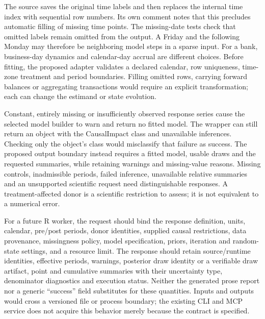 The source saves the original time labels and then replaces the internal
time index with sequential row numbers. Its own comment notes that this
precludes automatic filling of missing time points. The missing-date tests
check that omitted labels remain omitted from the output. A Friday and the
following Monday may therefore be neighboring model steps in a sparse input.
For a bank, business-day dynamics and calendar-day accrual are different
choices. Before fitting, the proposed adapter validates a declared calendar,
row uniqueness, time-zone treatment and period boundaries. Filling omitted
rows, carrying forward balances or aggregating transactions would require
an explicit transformation; each can change the estimand or state evolution.
\citep{exec13_ci_semantics}

Constant, entirely missing or insufficiently observed response series cause
the selected model builder to warn and return no fitted model. The wrapper
can still return an object with the CausalImpact class and unavailable
inferences. Checking only the object's class would misclassify that failure
as success. The proposed output boundary instead requires a fitted model,
usable draws and the requested summaries, while retaining warnings and
missing-value reasons. Missing controls, inadmissible periods, failed
inference, unavailable relative summaries and an unsupported scientific
request need distinguishable responses. A treatment-affected donor is a
scientific restriction to assess; it is not equivalent to a numerical error.
\citep{exec13_ci_semantics,exec13_ci_reuse}

For a future R worker, the request should bind the response definition,
units, calendar, pre/post periods, donor identities, supplied causal
restrictions, data provenance, missingness policy, model specification,
priors, iteration and random-state settings, and a resource limit. The
response should retain source/runtime identities, effective periods,
warnings, posterior draw identity or a verifiable draw artifact, point and
cumulative summaries with their uncertainty type, denominator diagnostics
and execution status. Neither the generated prose report nor a generic
``success'' field substitutes for these quantities. Inputs and outputs would
cross a versioned file or process boundary; the existing CLI and MCP service
does not acquire this behavior merely because the contract is specified.
\citep{exec13_ci_reuse}

